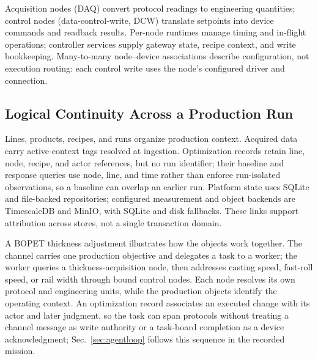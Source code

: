 Acquisition nodes (DAQ) convert protocol readings to engineering quantities;
control nodes (data-control-write, DCW) translate setpoints into device
commands and readback results. Per-node runtimes manage timing and in-flight
operations; controller services supply gateway state, recipe context, and
write bookkeeping. Many-to-many node--device associations describe
configuration, not execution routing: each control write uses the node's
configured driver and connection.

\subsection{Logical Continuity Across a Production Run}
Lines, products, recipes, and runs organize production context. Acquired data
carry active-context tags resolved at ingestion. Optimization records retain
line, node, recipe, and actor references, but no run identifier; their
baseline and response queries use node, line, and time rather than enforce
run-isolated observations, so a baseline can overlap an earlier run. Platform
state uses SQLite and file-backed repositories; configured measurement and
object backends are TimescaleDB and MinIO, with SQLite and disk fallbacks.
These links support attribution across stores, not a single transaction
domain.

A BOPET thickness adjustment illustrates how the objects work together. The
channel carries one production objective and delegates a task to a worker;
the worker queries a thickness-acquisition node, then addresses casting
speed, fast-roll speed, or rail width through bound control nodes. Each node
resolves its own protocol and engineering units, while the production
objects identify the operating context. An optimization record associates an
executed change with its actor and later judgment, so the task can span
protocols without treating a channel message as write authority or a
task-board completion as a device acknowledgment; Sec.~\ref{sec:agentloop}
follows this sequence in the recorded mission.
